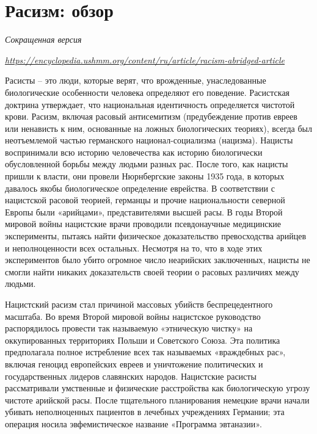 
\section{Расизм: обзор}

\textit{Сокращенная версия}

\textit{\url{https://encyclopedia.ushmm.org/content/ru/article/racism-abridged-article}}


Расисты – это люди, которые верят, что врожденные, унаследованные биологические особенности человека определяют его поведение. Расистская доктрина утверждает, что национальная идентичность определяется чистотой крови. Расизм, включая расовый антисемитизм (предубеждение против евреев или ненависть к ним, основанные на ложных биологических теориях), всегда был неотъемлемой частью германского национал-социализма (нацизма). Нацисты воспринимали всю историю человечества как историю биологически обусловленной борьбы между людьми разных рас. После того, как нацисты пришли к власти, они провели Нюрнбергские законы 1935 года, в которых давалось якобы биологическое определение еврейства. В соответствии с нацистской расовой теорией, германцы и прочие национальности северной Европы были «арийцами», представителями высшей расы. В годы Второй мировой войны нацистские врачи проводили псевдонаучные медицинские эксперименты, пытаясь найти физическое доказательство превосходства арийцев и неполноценности всех остальных. Несмотря на то, что в ходе этих экспериментов было убито огромное число неарийских заключенных, нацисты не смогли найти никаких доказательств своей теории о расовых различиях между людьми.

Нацистский расизм стал причиной массовых убийств беспрецедентного масштаба. Во время Второй мировой войны нацистское руководство распорядилось провести так называемую «этническую чистку» на оккупированных территориях Польши и Советского Союза. Эта политика предполагала полное истребление всех так называемых «враждебных рас», включая геноцид европейских евреев и уничтожение политических и государственных лидеров славянских народов. Нацистские расисты рассматривали умственные и физические расстройства как биологическую угрозу чистоте арийской расы. После тщательного планирования немецкие врачи начали убивать неполноценных пациентов в лечебных учреждениях Германии; эта операция носила эвфемистическое название «Программа эвтаназии».

